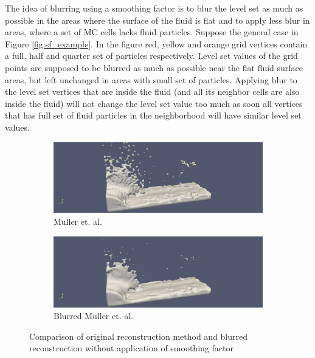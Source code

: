 The idea of blurring using a smoothing factor is to blur the level set as much as possible in the areas where the surface of the fluid is flat and to apply less blur in areas, where a set of MC cells lacks fluid particles. Suppose the general case in Figure \ref{fig:sf_example}. In the figure red, yellow and orange grid vertices contain a full, half and quarter set of particles respectively. Level set values of the grid points are supposed to be blurred as much as possible near the flat fluid surface areas, but left unchanged in areas with small set of particles.
Applying blur to the level set vertices that are inside the fluid (and all its neighbor cells are also inside the fluid) will not change the level set value too much as soon all vertices that has full set of fluid particles in the neighborhood will have similar level set values.\\
\begin{figure}[H]
	\begin{center}
		\begin{subfigure}[b]{\textwidth}
			\includegraphics[width=\textwidth]{figures/DenvityBlurredSplashArea.png}
			\caption{Muller et. al.}
			\label{fig:denc_rec}
		\end{subfigure}
		\begin{subfigure}[b]{\textwidth}
			\includegraphics[width=\textwidth]{figures/DenvityBasedSplashArea.png}
			\caption{Blurred Muller et. al.}
			\label{fig:blur_w_o_sf}
		\end{subfigure}
	\end{center}
	\caption{Comparison of original reconstruction method and blurred reconstruction without application of smoothing factor}
	\label{fig:blur_thin_area}
\end{figure}
